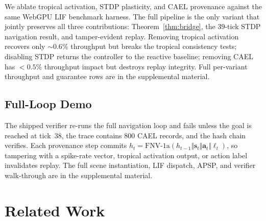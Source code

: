 \documentclass[10pt]{article}
\newcommand{\cael}{\textsc{CAEL}}
\providecommand{\measuredFrom}[1]{}
\begin{document}
We ablate tropical activation, STDP plasticity, and \cael{} provenance against
the same WebGPU LIF benchmark harness.
The full pipeline is the only variant that jointly preserves all three
contributions: Theorem~\ref{thm:bridge}, the $39$-tick STDP navigation result,
and tamper-evident replay.
Removing tropical activation recovers only $\sim0.6\%$ throughput but breaks the
tropical consistency tests; disabling STDP returns the controller to the
reactive baseline; removing \cael{} has $<0.5\%$ throughput impact but destroys
replay integrity.
Full per-variant throughput and guarantee rows are in the supplemental material.

\subsection{Full-Loop Demo}
\label{sec:demo}

The shipped verifier re-runs the full navigation loop and fails unless the goal
is reached at tick~38, the trace contains 800 \cael{} records, and the hash
chain verifies.
Each provenance step commits
$h_t=\text{FNV-1a}(h_{t-1}\Vert\mathbf{s}_t\Vert\mathbf{a}_t\Vert\ell_t)$, so
tampering with a spike-rate vector, tropical activation output, or action label
invalidates replay.
The full scene instantiation, LIF dispatch, APSP, and verifier walk-through are
in the supplemental material.
\measuredFrom{research/paper-2-demo/reproduce.mjs}%
\measuredFrom{research/paper-2-demo/FULL_LOOP_VERIFICATION_2026-05-10.md}%

\section{Related Work}
\label{sec:related}
\end{document}
